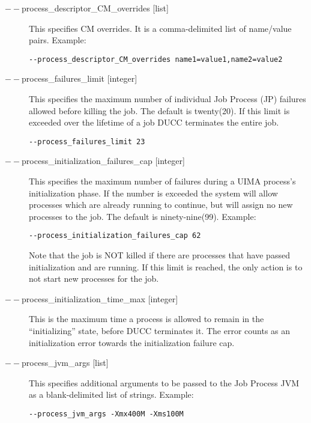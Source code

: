 \begin{description}
           \item[$--$process\_descriptor\_CM\_overrides {[list]}  ]

             This specifies CM overrides. It is a comma-delimited list of name/value pairs. Example: 
             \begin{verbatim}
--process_descriptor_CM_overrides name1=value1,name2=value2 
\end{verbatim}
             
           \item[$--$process\_failures\_limit {[integer]} ]

             This specifies the maximum number of individual Job Process (JP) failures allowed
             before killing the job. The default is twenty(20). If this limit is exceeded over the lifetime 
             of a job DUCC terminates the entire job. 
             \begin{verbatim}
--process_failures_limit 23
\end{verbatim}
                          
           \item[$--$process\_initialization\_failures\_cap {[integer]} ] This specifies the maximum
             number of failures during a UIMA process's initialization phase.  If the number is
             exceeded the system will allow processes which are already running to continue, but
             will assign no new processes to the job.  The default is ninety-nine(99). Example:
             \begin{verbatim}
--process_initialization_failures_cap 62 
             \end{verbatim}
             
             Note that the job is NOT killed if there are processes that have passed initialization and are 
             running. If this limit is reached, the only action is to not start new processes for the job. 

           \item[$--$process\_initialization\_time\_max {[integer]}] This is the maximum time a process
             is allowed to remain in the ``initializing'' state, before DUCC terminates it.  The error
             counts as an initialization error towards the initialization failure cap.

           \item[$--$process\_jvm\_args {[list]} ] This specifies additional arguments to be passed to
             the Job Process JVM as a blank-delimited list of strings. Example:
             \begin{verbatim}
--process_jvm_args -Xmx400M -Xms100M
             \end{verbatim}


\end{description}
